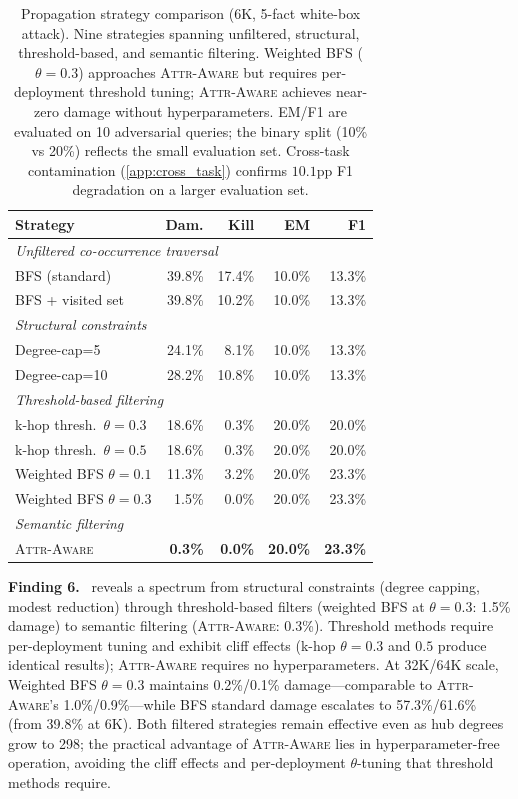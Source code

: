 \documentclass{article}
\newcommand{\attraware}{\textsc{Attr-Aware}}
\newcommand{\finding}[1]{\vspace{2pt}\noindent\textbf{Finding #1.}~}
\begin{document}
\begin{table}[htbp]
\centering
\scriptsize
\begin{tabular}{lrrrr}
\toprule
\textbf{Strategy} & \textbf{Dam.} & \textbf{Kill} & \textbf{EM} & \textbf{F1} \\
\midrule
\multicolumn{5}{l}{\textit{Unfiltered co-occurrence traversal}} \\
BFS (standard) & 39.8\% & 17.4\% & 10.0\% & 13.3\% \\
BFS + visited set & 39.8\% & 10.2\% & 10.0\% & 13.3\% \\
\midrule
\multicolumn{5}{l}{\textit{Structural constraints}} \\
Degree-cap=5 & 24.1\% & 8.1\% & 10.0\% & 13.3\% \\
Degree-cap=10 & 28.2\% & 10.8\% & 10.0\% & 13.3\% \\
\midrule
\multicolumn{5}{l}{\textit{Threshold-based filtering}} \\
k-hop thresh.\ $\theta{=}0.3$ & 18.6\% & 0.3\% & 20.0\% & 20.0\% \\
k-hop thresh.\ $\theta{=}0.5$ & 18.6\% & 0.3\% & 20.0\% & 20.0\% \\
Weighted BFS $\theta{=}0.1$ & 11.3\% & 3.2\% & 20.0\% & 23.3\% \\
Weighted BFS $\theta{=}0.3$ & 1.5\% & 0.0\% & 20.0\% & 23.3\% \\
\midrule
\multicolumn{5}{l}{\textit{Semantic filtering}} \\
\attraware{} & \textbf{0.3\%} & \textbf{0.0\%} & \textbf{20.0\%} & \textbf{23.3\%} \\
\bottomrule
\end{tabular}
\caption{Propagation strategy comparison (6K, 5-fact white-box attack). Nine strategies spanning unfiltered, structural, threshold-based, and semantic filtering. Weighted BFS ($\theta{=}0.3$) approaches \attraware{} but requires per-deployment threshold tuning; \attraware{} achieves near-zero damage without hyperparameters. EM/F1 are evaluated on 10 adversarial queries; the binary split (10\% vs 20\%) reflects the small evaluation set. Cross-task contamination (\cref{app:cross_task}) confirms $10.1$pp F1 degradation on a larger evaluation set.}
\label{tab:defense}
\end{table}

\finding{6}  reveals a spectrum from structural constraints (degree capping, modest reduction) through threshold-based filters (weighted BFS at $\theta{=}0.3$: 1.5\% damage) to semantic filtering (\attraware{}: 0.3\%).
Threshold methods require per-deployment tuning and exhibit cliff effects (k-hop $\theta{=}0.3$ and $0.5$ produce identical results); \attraware{} requires no hyperparameters.
At 32K/64K scale, Weighted BFS $\theta{=}0.3$ maintains 0.2\%/0.1\% damage---comparable to \attraware{}'s 1.0\%/0.9\%---while BFS standard damage escalates to 57.3\%/61.6\% (from 39.8\% at 6K).
Both filtered strategies remain effective even as hub degrees grow to 298; the practical advantage of \attraware{} lies in hyperparameter-free operation, avoiding the cliff effects and per-deployment $\theta$-tuning that threshold methods require.
\end{document}
